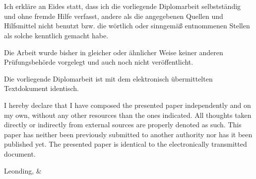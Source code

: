 \thispagestyle{empty}
\vspace{3cm}
~ \\ \\
{
Ich erkläre an Eides statt, dass ich die vorliegende Diplomarbeit selbstständig und ohne fremde Hilfe verfasst, andere als die angegebenen Quellen und Hilfsmittel nicht benutzt bzw. die wörtlich oder sinngemäß entnommenen Stellen als solche kenntlich gemacht habe.

Die Arbeit wurde bisher in gleicher oder ähnlicher Weise keiner anderen Prüfungsbehörde vorgelegt und auch noch nicht veröffentlicht.

Die vorliegende Diplomarbeit ist mit dem elektronisch übermittelten Textdokument identisch.
}
{
I hereby declare that I have composed the presented paper independently and on my own, without any other resources than the ones indicated. 
All thoughts taken directly or indirectly from external sources are properly denoted as such.
This paper has neither been previously submitted to another authority nor has it been published yet.
The presented paper is identical to the electronically transmitted document.
}
\vspace{3cm}
\begin{tabbing}
Leonding,  \hspace{2cm} {\firstauthor} \& {\secondauthor} %
\end{tabbing}
\vspace{10cm}
\newpage